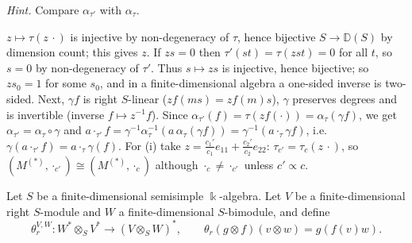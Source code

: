 \documentclass[11pt,a4paper]{exam}
\newcommand{\kk}{\Bbbk}
\newcommand{\bbD}{\mathbb D}
\newcommand{\grstar}{(*)}
\begin{document}
\begin{questions}
\begin{parts}
\begin{subparts}
\emph{Hint.} Compare $\alpha_{\tau'}$ with $\alpha_\tau$.
\begin{solution}
$z\mapsto\tau(z\,\cdot)$ is injective by non-degeneracy of $\tau$, hence bijective $S\to\bbD(S)$ by dimension count; this gives $z$.
If $zs=0$ then $\tau'(st)=\tau(zst)=0$ for all $t$, so $s=0$ by non-degeneracy of $\tau'$.
Thus $s\mapsto zs$ is injective, hence bijective; so $zs_0=1$ for some $s_0$, and in a finite-dimensional algebra a one-sided inverse is two-sided.
Next, $\gamma f$ is right $S$-linear ($zf(ms)=zf(m)s$), $\gamma$ preserves degrees and is invertible (inverse $f\mapsto z^{-1}f$).
Since $\alpha_{\tau'}(f)=\tau(zf(\cdot))=\alpha_\tau(\gamma f)$, we get $\alpha_{\tau'}=\alpha_\tau\circ\gamma$ and
$a\cdot_{\tau'}f=\gamma^{-1}\alpha_\tau^{-1}(a\,\alpha_\tau(\gamma f))=\gamma^{-1}(a\cdot_\tau\gamma f)$, i.e.\ $\gamma(a\cdot_{\tau'}f)=a\cdot_\tau\gamma(f)$.
For (i) take $z=\frac{c_1'}{c_1}e_{11}+\frac{c_2'}{c_2}e_{22}$: $\tau_{c'}=\tau_c(z\,\cdot)$, so $(M^{\grstar},\cdot_{c'})\cong(M^{\grstar},\cdot_c)$ although $\cdot_c\neq\cdot_{c'}$ unless $c'\propto c$.
\end{solution}
\end{subparts}
\end{parts}

\newpage
{}
Let $S$ be a finite-dimensional semisimple $\kk$-algebra. 
Let $V$ be a finite-dimensional right $S$-module and $W$ a finite-dimensional
$S$-bimodule, and define
\[
  \theta_r^{V,W}:W^*\otimes_SV^*\longrightarrow(V\otimes_SW)^*,\qquad
  \theta_r(g\otimes f)(v\otimes w)=g(f(v)w).
\]
\end{questions}
\end{document}

